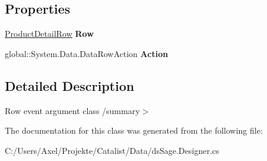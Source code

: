 \subsection*{Properties}
\begin{DoxyCompactItemize}
\item 
\hyperlink{class_products_1_1_data_1_1ds_sage_1_1_product_detail_row}{Product\+Detail\+Row} {\bfseries Row}\hypertarget{class_products_1_1_data_1_1ds_sage_1_1_product_detail_row_change_event_a2af99aeb41f45538a19e1d7722541d68}{}\label{class_products_1_1_data_1_1ds_sage_1_1_product_detail_row_change_event_a2af99aeb41f45538a19e1d7722541d68}

\item 
global\+::\+System.\+Data.\+Data\+Row\+Action {\bfseries Action}\hypertarget{class_products_1_1_data_1_1ds_sage_1_1_product_detail_row_change_event_ae3ce660438ddf9baed733eb3f7d019ef}{}\label{class_products_1_1_data_1_1ds_sage_1_1_product_detail_row_change_event_ae3ce660438ddf9baed733eb3f7d019ef}

\end{DoxyCompactItemize}


\subsection{Detailed Description}
Row event argument class /summary$>$ 

The documentation for this class was generated from the following file\+:\begin{DoxyCompactItemize}
\item 
C\+:/\+Users/\+Axel/\+Projekte/\+Catalist/\+Data/ds\+Sage.\+Designer.\+cs\end{DoxyCompactItemize}
